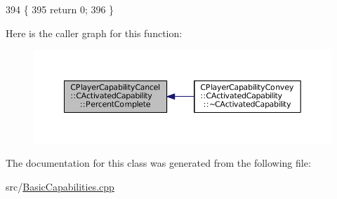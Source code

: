 \begin{DoxyCode}
394                                                                        \{
395     \textcolor{keywordflow}{return} 0;
396 \}
\end{DoxyCode}
Here is the caller graph for this function\+:\nopagebreak
\begin{figure}[H]
\begin{center}
\leavevmode
\includegraphics[width=350pt]{classCPlayerCapabilityCancel_1_1CActivatedCapability_a69d2fec27186cba11ab545560e7bf45d_icgraph}
\end{center}
\end{figure}


The documentation for this class was generated from the following file\+:\begin{DoxyCompactItemize}
\item 
src/\hyperlink{BasicCapabilities_8cpp}{Basic\+Capabilities.\+cpp}\end{DoxyCompactItemize}
